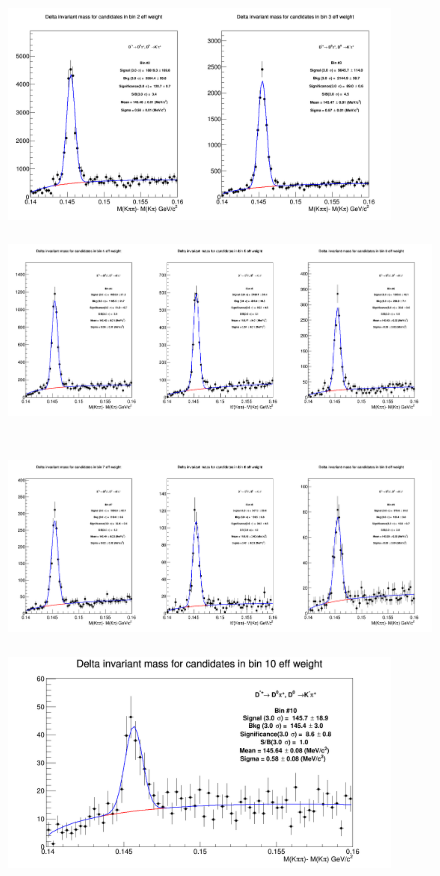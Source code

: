\begin{figure}[!htp]
\centering
{\includegraphics[width=1\linewidth, height=5.6cm]{figures/DStar_pp/InvMassDistributions_Dstar_Bins2to3.png}}
{\includegraphics[width=1\linewidth, height=5.6cm]{figures/DStar_pp/InvMassDistributions_Dstar_Bins4to6.png}}
{\includegraphics[width=1\linewidth, height=5.6cm]{figures/DStar_pp/InvMassDistributions_Dstar_Bins7to9.png}}
{\includegraphics[width=0.6\linewidth, height=5.6cm]{figures/DStar_pp/InvMassDistributions_Dstar_Bins10to10.png}}


\end{figure}
